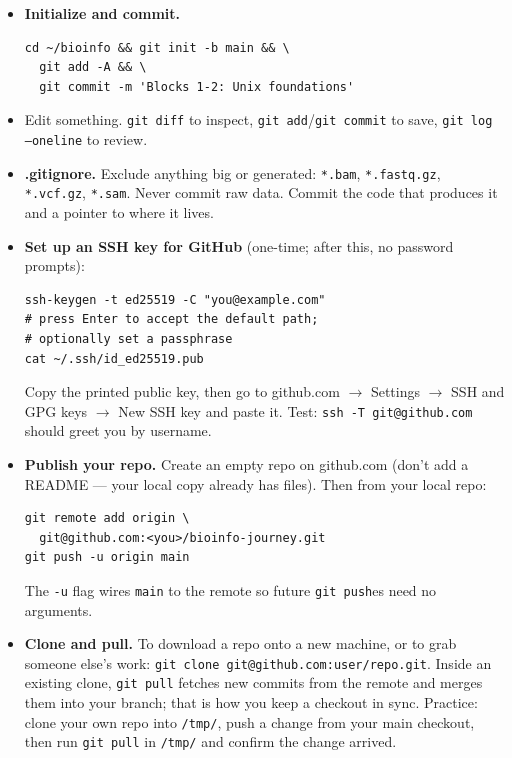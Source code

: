 \begin{itemize}[nosep]
  \item \textbf{Initialize and commit.}
    \begin{lstlisting}
cd ~/bioinfo && git init -b main && \
  git add -A && \
  git commit -m 'Blocks 1-2: Unix foundations'
    \end{lstlisting}
  \item Edit something. \texttt{git diff} to inspect, \texttt{git add}/\texttt{git commit} to save, \texttt{git log --oneline} to review.
  \item \textbf{.gitignore.} Exclude anything big or generated: \texttt{*.bam}, \texttt{*.fastq.gz}, \texttt{*.vcf.gz}, \texttt{*.sam}. Never commit raw data. Commit the code that produces it and a pointer to where it lives.
  \item \textbf{Set up an SSH key for GitHub} (one-time; after this, no password prompts):
    \begin{lstlisting}
ssh-keygen -t ed25519 -C "you@example.com"
# press Enter to accept the default path;
# optionally set a passphrase
cat ~/.ssh/id_ed25519.pub
    \end{lstlisting}
    Copy the printed public key, then go to github.com $\to$ Settings $\to$ SSH and GPG keys $\to$ New SSH key and paste it. Test: \texttt{ssh -T git@github.com} should greet you by username.
  \item \textbf{Publish your repo.} Create an empty repo on github.com (don't add a README --- your local copy already has files). Then from your local repo:
    \begin{lstlisting}
git remote add origin \
  git@github.com:<you>/bioinfo-journey.git
git push -u origin main
    \end{lstlisting}
    The \texttt{-u} flag wires \texttt{main} to the remote so future \texttt{git push}es need no arguments.
  \item \textbf{Clone and pull.} To download a repo onto a new machine, or to grab someone else's work: \texttt{git clone git@github.com:user/repo.git}. Inside an existing clone, \texttt{git pull} fetches new commits from the remote and merges them into your branch; that is how you keep a checkout in sync. Practice: clone your own repo into \texttt{/tmp/}, push a change from your main checkout, then run \texttt{git pull} in \texttt{/tmp/} and confirm the change arrived.
\end{itemize}
